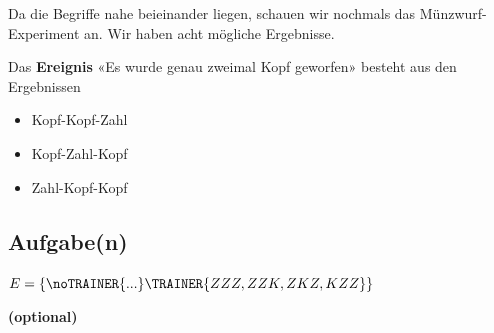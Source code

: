 Da die Begriffe nahe beieinander liegen, schauen wir
nochmals das Münzwurf-Experiment an. Wir haben acht mögliche
Ergebnisse. 

Das \textbf{Ereignis} «Es wurde genau zweimal Kopf geworfen» besteht
aus den Ergebnissen

\begin{itemize}
\item Kopf-Kopf-Zahl
\item Kopf-Zahl-Kopf
\item Zahl-Kopf-Kopf
\end{itemize}

\subsection*{Aufgabe(n)}

$E = \{\noTRAINER{...}\TRAINER{ZZZ,ZZK, ZKZ, KZZ\}}$



\textbf{(optional)}


\newpage

